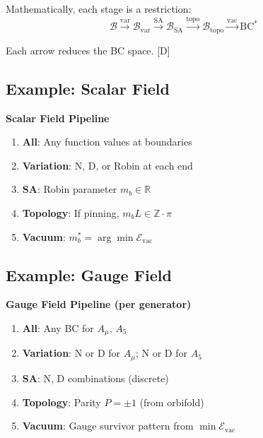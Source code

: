 \documentclass[11pt,a4paper]{article}
\newcommand{\tagD}{\textcolor{blue!70!black}{[D]}}
\begin{document}
Mathematically, each stage is a restriction:
\begin{equation}
\label{eq:pipeline-functor}
\mathcal{B} \xrightarrow{\text{var}} \mathcal{B}_{\text{var}} \xrightarrow{\text{SA}} \mathcal{B}_{\text{SA}}
\xrightarrow{\text{topo}} \mathcal{B}_{\text{topo}} \xrightarrow{\text{vac}} \text{BC}^*
\end{equation}

Each arrow reduces the BC space. \tagD

\subsection{Example: Scalar Field}

\begin{pipelinebox}
\textbf{Scalar Field Pipeline}
\begin{enumerate}
    \item \textbf{All}: Any function values at boundaries
    \item \textbf{Variation}: N, D, or Robin at each end
    \item \textbf{SA}: Robin parameter $m_b \in \mathbb{R}$
    \item \textbf{Topology}: If pinning, $m_b L \in \mathbb{Z} \cdot \pi$
    \item \textbf{Vacuum}: $m_b^* = \arg\min \mathcal{E}_{\text{vac}}$
\end{enumerate}
\end{pipelinebox}

\subsection{Example: Gauge Field}

\begin{pipelinebox}
\textbf{Gauge Field Pipeline (per generator)}
\begin{enumerate}
    \item \textbf{All}: Any BC for $A_\mu$, $A_5$
    \item \textbf{Variation}: N or D for $A_\mu$; N or D for $A_5$
    \item \textbf{SA}: N, D combinations (discrete)
    \item \textbf{Topology}: Parity $P = \pm 1$ (from orbifold)
    \item \textbf{Vacuum}: Gauge survivor pattern from $\min \mathcal{E}_{\text{vac}}$
\end{enumerate}
\end{pipelinebox}
\end{document}
